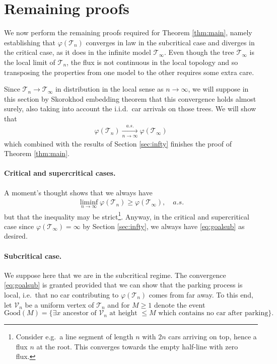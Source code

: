  
\section{Remaining proofs}
We now perform the remaining proofs required for Theorem \ref{thm:main}, namely establishing that $\varphi( \mathcal{T}_n)$ converges in law in the subcritical case and diverges in the critical case, as it does in the infinite model $\mathcal T_{\infty}$.
Even though the tree $\mathcal T_{\infty}$ is the local limit of $\mathcal T_{n}$, the flux is not continuous in the local topology and so transposing the properties from one model to the other requires some extra care. \medskip 


Since $ \mathcal{T}_n \to \mathcal{T}_\infty$ in distribution in the local sense as $n \to \infty$, we will suppose in this 
section by Skorokhod embedding theorem that this convergence holds almost surely, also taking into account the i.i.d.~car arrivals on those trees. We will show that 
 \begin{eqnarray} \label{eq:goalsub} \varphi(\mathcal{T}_n) \xrightarrow[n\to\infty]{a.s.} \varphi( \mathcal{T}_\infty) \end{eqnarray} which combined with the results of Section \ref{sec:infty} finishes the proof of Theorem \ref{thm:main}.


\paragraph{Critical and supercritical cases.}  A moment's thought shows that we always have
 \begin{eqnarray}\label{eq:fatou} \liminf_{n \to \infty}\varphi ( \mathcal{T}_n)  \geq \varphi( \mathcal{T}_\infty),   \quad a.s.\end{eqnarray}
but that the inequality may be strict\footnote{Consider e.g.~a line segment of length $n$ with $2n$ cars arriving on top, hence a flux $n$ at the root. This converges towards the empty half-line with zero flux.}. Anyway, in the critical and supercritical case since $ \varphi( \mathcal{T}_\infty) = \infty$ by Section \ref{sec:infty}, we always have \eqref{eq:goalsub} as desired.
 

\paragraph{Subcritical case.} We suppose here that we are in the subcritical regime. The convergence \eqref{eq:goalsub} is granted provided that we can show that the parking process is local, i.e.~that no car contributing to $ \varphi( \mathcal{T}_n)$ comes from far away. To this end, let $ \mathcal{V}_n$ be a uniform vertex of $ \mathcal{T}_n$ and for $M \geq 1$ denote the event 
$$ \mathrm{Good}(M) = \{\exists x \mbox{ ancestor of } \mathcal{V}_n \mbox{ at height }\leq M \mbox{ which contains no car after parking}\}.$$

